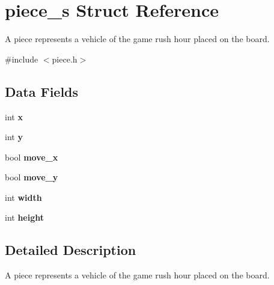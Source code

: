 \hypertarget{structpiece__s}{}\section{piece\+\_\+s Struct Reference}
\label{structpiece__s}


A piece represents a vehicle of the game rush hour placed on the board.  




{\ttfamily \#include $<$piece.\+h$>$}

\subsection*{Data Fields}
\begin{DoxyCompactItemize}
\item 
int {\bfseries x}\hypertarget{structpiece__s_a6150e0515f7202e2fb518f7206ed97dc}{}\label{structpiece__s_a6150e0515f7202e2fb518f7206ed97dc}

\item 
int {\bfseries y}\hypertarget{structpiece__s_a0a2f84ed7838f07779ae24c5a9086d33}{}\label{structpiece__s_a0a2f84ed7838f07779ae24c5a9086d33}

\item 
bool {\bfseries move\+\_\+x}\hypertarget{structpiece__s_a13a834340f8035bb114fac1a99fff5eb}{}\label{structpiece__s_a13a834340f8035bb114fac1a99fff5eb}

\item 
bool {\bfseries move\+\_\+y}\hypertarget{structpiece__s_a0b3965a3409ffefa774e6a6d6c610627}{}\label{structpiece__s_a0b3965a3409ffefa774e6a6d6c610627}

\item 
int {\bfseries width}\hypertarget{structpiece__s_a2474a5474cbff19523a51eb1de01cda4}{}\label{structpiece__s_a2474a5474cbff19523a51eb1de01cda4}

\item 
int {\bfseries height}\hypertarget{structpiece__s_ad12fc34ce789bce6c8a05d8a17138534}{}\label{structpiece__s_ad12fc34ce789bce6c8a05d8a17138534}

\end{DoxyCompactItemize}


\subsection{Detailed Description}
A piece represents a vehicle of the game rush hour placed on the board. 

